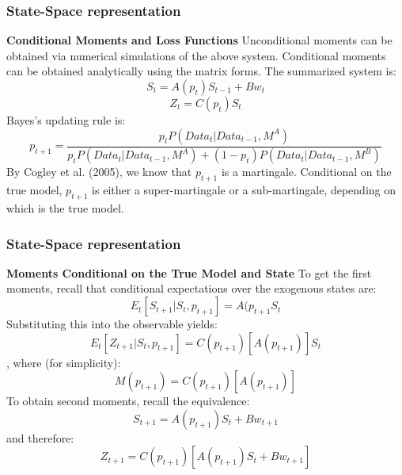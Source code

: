\documentclass{beamer}
\begin{document}
\begin{frame}
\frametitle{State-Space representation}
\textbf{Conditional Moments and Loss Functions}
Unconditional moments can be obtained via numerical simulations of the above
system. Conditional moments can be obtained analytically using the matrix forms.
The summarized system is:
\begin{equation}
S_t = A (p_t) S_{t-1} + B w_t
\end{equation}
\begin{equation}
Z_t = C(p_t) S_t
\end{equation}
Bayes's updating rule is:
\begin{equation}
p_{t+1} = \frac{p_t P(Data_t|Data_{t-1},M^A)}{p_t P(Data_t|Data_{t-1},M^A) + (1-p_t) P(Data_t|Data_{t-1},M^B) }
\end{equation}
By Cogley et al. (2005), we know that $p_{t+1}$ is a martingale. Conditional on
the true model, $p_{t+1}$ is either a super-martingale or a sub-martingale,
depending on which is the true model.
\end{frame}

\begin{frame}
\frametitle{State-Space representation}
\textbf{Moments Conditional on the True Model and State} To get the first
moments, recall that conditional expectations over the exogenous states are:
\begin{equation}
E_t [S_{t+1}|S_t,p_{t+1}] = A(p_{t+1} S_t
\end{equation}
Substituting this into the observable yields:
\begin{equation}
E_t [Z_{t+1} | S_t,p_{t+1} ] = C (p_{t+1}) [A(p_{t+1})] S_t
\end{equation}
, where (for simplicity):
\begin{equation}
M (p_{t+1}) = C (p_{t+1}) [A (p_{t+1})]
\end{equation}
To obtain second moments, recall the equivalence:
\begin{equation}
S_{t+1} = A (p_{t+1}) S_t + B w_{t+1}
\end{equation}
and therefore:
\begin{equation}
Z_{t+1} = C (p_{t+1}) [A(p_{t+1}) S_t + B w_{t+1}]
\end{equation}
\end{frame}
\end{document}
